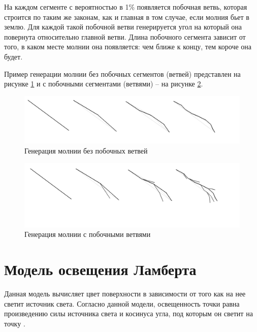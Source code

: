 На каждом сегменте с вероятностью в 1\% появляется побочная ветвь, которая строится по таким же законам, как и главная в том случае, если молния бьет в землю. Для каждой такой побочной ветви генерируется угол на который она повернута относительно главной ветви. Длина побочного сегмента зависит от того, в каком месте молнии она появляется: чем ближе к концу, тем короче она будет. 

Пример генерации молнии без побочных сегментов (ветвей) представлен на рисунке \ref{img:moln1} и с побочными сегментами (ветвями) -- на рисунке \ref{img:moln2}.


\begin{figure}[H]
	\begin{center}
		\includegraphics[scale=0.48]{img/moln1.png}
	\end{center}
	\captionsetup{justification=centering}
	\caption{Генерация молнии без побочных ветвей}
	\label{img:moln1}
\end{figure}

\begin{figure}[H]
	\begin{center}
		\includegraphics[scale=0.48]{img/moln2.png}
	\end{center}
	\captionsetup{justification=centering}
	\caption{Генерация молнии с побочными ветвями}
	\label{img:moln2}
\end{figure}


\section{Модель освещения Ламберта}

Данная модель вычисляет цвет поверхности в зависимости от того как на нее светит источник света. Согласно данной модели, освещенность точки равна произведению силы источника света и косинуса угла, под которым он светит на точку \cite{lamber_fong}.

